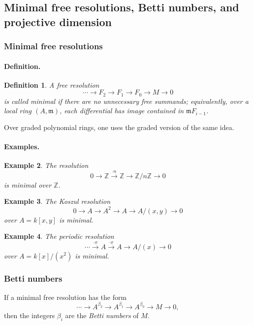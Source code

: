 \documentclass[12pt,a4paper]{article}
\theoremstyle{notespace}
\newtheorem{definition}{Definition}[section]
\newtheorem{example}[definition]{Example}
\newcommand{\ZZ}{\mathbb{Z}}
\begin{document}
\subsection{Minimal free resolutions, Betti numbers, and projective dimension}

\subsubsection{Minimal free resolutions}

\paragraph{Definition.}

\begin{definition}
	A free resolution
	\[
	\cdots \to F_2\to F_1\to F_0\to M\to 0
	\]
	is called \emph{minimal} if there are no unnecessary free summands; equivalently, over a local ring \((A,\mathfrak m)\), each differential has image contained in \(\mathfrak m F_{i-1}\).
\end{definition}

Over graded polynomial rings, one uses the graded version of the same idea.

\paragraph{Examples.}

\begin{example}
	The resolution
	\[
	0\to \ZZ \xrightarrow{\cdot n} \ZZ \to \ZZ/n\ZZ \to 0
	\]
	is minimal over \(\ZZ\).
\end{example}

\begin{example}
	The Koszul resolution
	\[
	0\to A \to A^2 \to A \to A/(x,y)\to 0
	\]
	over \(A=k[x,y]\) is minimal.
\end{example}

\begin{example}
	The periodic resolution
	\[
	\cdots \xrightarrow{\cdot x} A \xrightarrow{\cdot x} A \to A/(x)\to 0
	\]
	over \(A=k[x]/(x^2)\) is minimal.
\end{example}

\subsubsection{Betti numbers}

If a minimal free resolution has the form
\[
\cdots \to A^{\beta_2}\to A^{\beta_1}\to A^{\beta_0}\to M\to 0,
\]
then the integers \(\beta_i\) are the \emph{Betti numbers} of \(M\).
\end{document}
